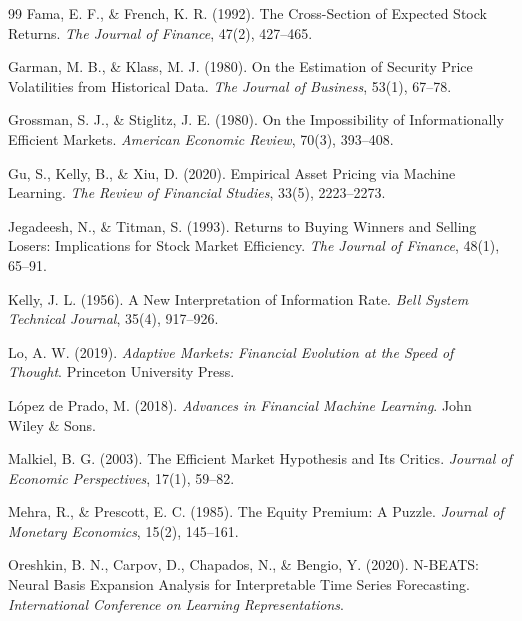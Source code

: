 \documentclass[11pt,a4paper]{article}
\begin{document}
\begin{thebibliography}{99}
Fama, E. F., \& French, K. R. (1992).
\newblock The Cross-Section of Expected Stock Returns.
\newblock \textit{The Journal of Finance}, 47(2), 427--465.

Garman, M. B., \& Klass, M. J. (1980).
\newblock On the Estimation of Security Price Volatilities from Historical Data.
\newblock \textit{The Journal of Business}, 53(1), 67--78.

Grossman, S. J., \& Stiglitz, J. E. (1980).
\newblock On the Impossibility of Informationally Efficient Markets.
\newblock \textit{American Economic Review}, 70(3), 393--408.

Gu, S., Kelly, B., \& Xiu, D. (2020).
\newblock Empirical Asset Pricing via Machine Learning.
\newblock \textit{The Review of Financial Studies}, 33(5), 2223--2273.

Jegadeesh, N., \& Titman, S. (1993).
\newblock Returns to Buying Winners and Selling Losers: Implications for Stock Market Efficiency.
\newblock \textit{The Journal of Finance}, 48(1), 65--91.

Kelly, J. L. (1956).
\newblock A New Interpretation of Information Rate.
\newblock \textit{Bell System Technical Journal}, 35(4), 917--926.

Lo, A. W. (2019).
\newblock \textit{Adaptive Markets: Financial Evolution at the Speed of Thought}.
\newblock Princeton University Press.

López de Prado, M. (2018).
\newblock \textit{Advances in Financial Machine Learning}.
\newblock John Wiley \& Sons.

Malkiel, B. G. (2003).
\newblock The Efficient Market Hypothesis and Its Critics.
\newblock \textit{Journal of Economic Perspectives}, 17(1), 59--82.

Mehra, R., \& Prescott, E. C. (1985).
\newblock The Equity Premium: A Puzzle.
\newblock \textit{Journal of Monetary Economics}, 15(2), 145--161.

Oreshkin, B. N., Carpov, D., Chapados, N., \& Bengio, Y. (2020).
\newblock N-BEATS: Neural Basis Expansion Analysis for Interpretable Time Series Forecasting.
\newblock \textit{International Conference on Learning Representations}.


\end{thebibliography}
\end{document}
